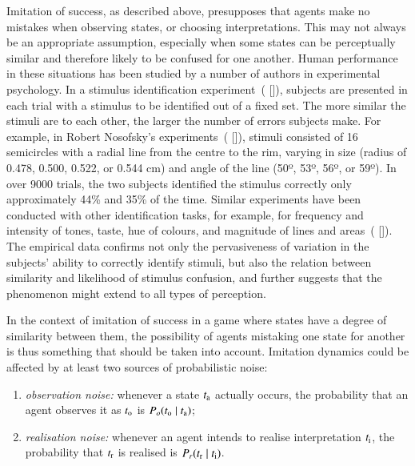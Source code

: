 \documentclass[12pt,english]{article}
\numberwithin{equation}{section}
\newcommand{\citepbjps}[1]{(\citeauthor{#1} [\citeyear{#1}])}
\begin{document}
Imitation of success, as described above, presupposes that agents make no mistakes when
observing states, or choosing interpretations. This may not always be an appropriate
assumption, especially when some states can be perceptually similar and therefore likely to be
confused for one another.
Human performance in these situations has been studied by a number of authors in experimental psychology. %
In a stimulus identification experiment~\citepbjps{luce-detection-1963}, subjects are presented in each trial with a stimulus to be identified out of a fixed set.
The more similar the stimuli are to each other, the larger the number of errors subjects make.
For example, in Robert Nosofsky's experiments~\citepbjps{Nosofsky1986:Attention-Simil}, stimuli consisted of 16 semicircles with a radial line from the centre to the rim, varying in size (radius of 0.478, 0.500, 0.522, or 0.544 cm) and angle of the line (50º, 53º, 56º, or 59º).
In over 9000 trials, the two subjects identified the stimulus correctly only approximately 44\% and 35\% of the time.
Similar experiments have been conducted with other identification tasks, for example, for frequency and intensity of tones, taste, hue of colours, and magnitude of lines and areas~\citepbjps{donkin-why-2015}.
The empirical data confirms not only the pervasiveness of variation in the subjects' ability to correctly identify stimuli, but also the relation between similarity and likelihood of stimulus confusion, and further suggests that the phenomenon might extend to all types of perception.

In the context of imitation of success in a game where states have a degree of similarity between them, the possibility of agents mistaking one state for another is thus something that should be taken into account.
Imitation dynamics could be affected by at least two sources of probabilistic noise:

\begin{enumerate}
\item \emph{observation noise:} whenever a state $t_{\mathrm{a}}$ actually occurs, the probability
  that an agent observes it as $t_{\mathrm{o}}$ is $P_o(t_{\mathrm{o}} \mid t_{\mathrm{a}})$;
\item \emph{realisation noise:} whenever an agent intends to realise interpretation
  $t_{\mathrm{i}}$, the probability that $t_{\mathrm{r}}$ is realised is
  $P_r(t_{\mathrm{r}} \mid t_{\mathrm{i}})$.
\end{enumerate}
\end{document}
